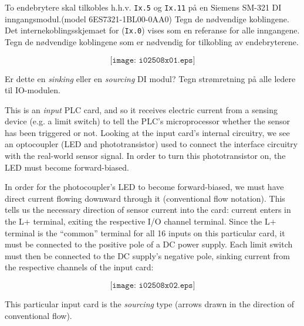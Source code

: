 

To endebrytere skal tilkobles h.h.v. \texttt{Ix.5} og \texttt{Ix.11} på en Siemens SM-321 DI inngangsmodul.(model 6ES7321-1BL00-0AA0) Tegn de nødvendige koblingene. Det internekoblingsskjemaet for (\texttt{Ix.0}) vises som en referanse for alle inngangene.
Tegn de nødvendige koblingene som er nødvendig for tilkobling av endebryterene.  


$$\texttt{[image: i02508x01.eps]}$$

Er dette en \textit{sinking} eller en \textit{sourcing} DI modul?
Tegn strømretning på alle ledere til IO-modulen. 
\vfil 

\eject






This is an {\it input} PLC card, and so it receives electric current from a sensing device (e.g. a limit switch) to tell the PLC's microprocessor whether the sensor has been triggered or not.  Looking at the input card's internal circuitry, we see an optocoupler (LED and phototransistor) used to connect the interface circuitry with the real-world sensor signal.  In order to turn this phototransistor on, the LED must become forward-biased.

In order for the photocoupler's LED to become forward-biased, we must have direct current flowing downward through it (conventional flow notation).  This tells us the necessary direction of sensor current into the card: current enters in the L+ terminal, exiting the respective I/O channel terminal.  Since the L+ terminal is the ``common'' terminal for all 16 inputs on this particular card, it must be connected to the positive pole of a DC power supply.  Each limit switch must then be connected to the DC supply's negative pole, sinking current from the respective channels of the input card:

$$\texttt{[image: i02508x02.eps]}$$

This particular input card is the {\it sourcing} type (arrows drawn in the direction of conventional flow).











